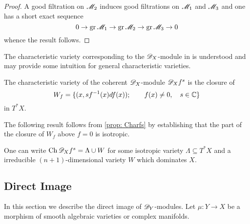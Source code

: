 \begin{proof}
  A good filtration on $\mathscr{M}_2$ induces good filtrations on $\mathscr{M}_1$ and $\mathscr{M}_3$ and one has a short exact sequence
  $$0\to \operatorname{gr} \mathscr{M}_1 \to \operatorname{gr} \mathscr{M}_2 \to \operatorname{gr} \mathscr{M}_3 \to 0 $$
  whence the result follows.
\end{proof}
The characteristic variety corresponding to the $\mathscr{D}_X$-module in  is understood and may provide some intuition for general characteristic varieties.
\begin{proposition}{{\cite[Theorem 5.3]{kashiwara1976b}}}\label{prop: Charfs}
  The characteristic variety of the coherent $\mathscr{D}_X$-module $\mathscr{D}_Xf^s$ is the closure of
  $$W_f = \{(x,sf^{-1}(x)df(x)); \qquad f(x)\neq 0,\quad s\in \mathbb{C} \}$$
  in $T^*X$.
\end{proposition}
The following result follows from \cref{prop: Charfs} by establishing that the part of the closure of $W_f$ above $f=0$ is isotropic.
\begin{proposition}{{\cite[Proposition 5.6]{kashiwara1976b}}}\label{prop: IsotropicAndDominate}
  One can write $\operatorname{Ch} \mathscr{D}_X f^s = \Lambda \cup W$ for some isotropic variety $\Lambda \subseteq T^*X$ and a irreducible $(n+1)$-dimensional variety $W$ which dominates $X$.
\end{proposition}
\subsection{Direct Image}
In this section we describe the direct image of $\mathscr{D}_Y$-modules.
Let $\mu:Y\to X$ be a morphism of smooth algebraic varieties or complex manifolds.

